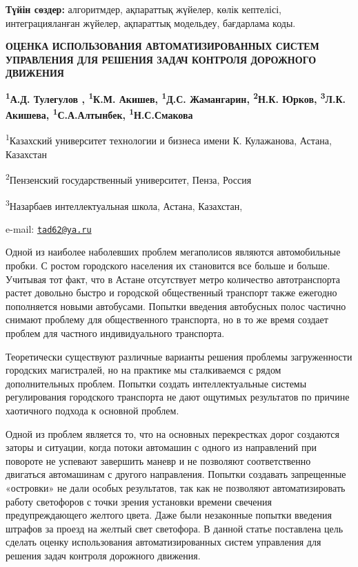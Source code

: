 {\bfseries Түйін сөздер:} алгоритмдер, ақпараттық жүйелер, көлік кептелісі,
интеграцияланған жүйелер, ақпараттық модельдеу, бағдарлама коды.

\begin{articleheader}
{\bfseries ОЦЕНКА ИСПОЛЬЗОВАНИЯ АВТОМАТИЗИРОВАННЫХ СИСТЕМ УПРАВЛЕНИЯ ДЛЯ
РЕШЕНИЯ ЗАДАЧ КОНТРОЛЯ ДОРОЖНОГО ДВИЖЕНИЯ}

{\bfseries \textsuperscript{1}А.Д. Тулегулов\textsuperscript{\envelope } ,
\textsuperscript{1}К.М. Акишев, \textsuperscript{1}Д.С. Жамангарин,
\textsuperscript{2}Н.К. Юрков, \textsuperscript{3}Л.К. Акишева,
\textsuperscript{1}С.А.Алтынбек, \textsuperscript{1}Н.С.Смакова}
\end{articleheader}

\begin{affiliation}
\textsuperscript{1}Казахский университет технологии и бизнеса имени К.
Кулажанова, Астана, Казахстан

\textsuperscript{2}Пензенский государственный университет, Пенза, Россия

\textsuperscript{3}Назарбаев интеллектуальная школа, Астана, Казахстан,

e-mail: \href{mailto:tad62@ya.ru}{\nolinkurl{tad62@ya.ru}}
\end{affiliation}

Одной из наиболее наболевших проблем мегаполисов являются автомобильные
пробки. С ростом городского населения их становится все больше и больше.
Учитывая тот факт, что в Астане отсутствует метро количество
автотранспорта растет довольно быстро и городской общественный транспорт
также ежегодно пополняется новыми автобусами. Попытки введения
автобусных полос частично снимают проблему для общественного транспорта,
но в то же время создает проблем для частного индивидуального
транспорта.

Теоретически существуют различные варианты решения проблемы
загруженности городских магистралей, но на практике мы сталкиваемся с
рядом дополнительных проблем. Попытки создать интеллектуальные системы
регулирования городского транспорта не дают ощутимых результатов по
причине хаотичного подхода к основной проблем.

Одной из проблем является то, что на основных перекрестках дорог
создаются заторы и ситуации, когда потоки автомашин с одного из
направлений при повороте не успевают завершить маневр и не позволяют
соответственно двигаться автомашинам с другого направления. Попытки
создавать запрещенные «островки» не дали особых результатов, так как не
позволяют автоматизировать работу светофоров с точки зрения установки
времени свечения предупреждающего желтого цвета. Даже были незаконные
попытки введения штрафов за проезд на желтый свет светофора. В данной
статье поставлена цель сделать оценку использования автоматизированных
систем управления для решения задач контроля дорожного движения.

